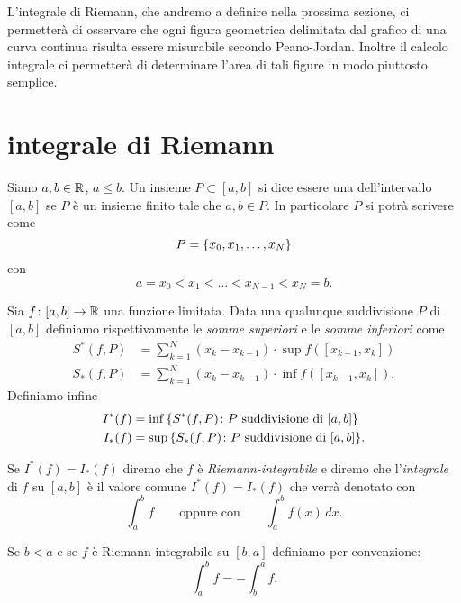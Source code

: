 L'integrale di Riemann, che andremo a definire
nella prossima sezione, ci permetterà di osservare che ogni figura geometrica
delimitata dal grafico di una curva continua risulta
essere misurabile secondo Peano-Jordan. Inoltre il calcolo integrale ci permetterà
di determinare l'area di tali figure in modo piuttosto semplice.


\section{integrale di Riemann}

\begin{definition}
\mymark{***}
Siano $a,b\in \mathbb R$, $a \le b$.
Un insieme $P\subset [a,b]$ si dice essere una 
dell'intervallo $[a,b]$ se $P$ è un insieme finito tale che $a,b\in P$.
In particolare $P$ si
potrà scrivere come
\[
 P = {\left\{  x_0, x_1, \dots, x_N \right\}}
\]
con
\[
  a = x_0 < x_1 < \dots < x_{N-1} < x_N = b.
\]

Sia $f\colon [a,b] \to \mathbb R$ una funzione limitata.
Data una qualunque suddivisione $P$ di $[a,b]$ definiamo
rispettivamente le \emph{somme superiori} e le \emph{somme inferiori}
come
\begin{align*}
S^*(f,P)
&= \sum_{k=1}^N (x_k - x_{k-1}) \cdot \sup f([x_{k-1},x_k]) \\
S_*(f,P)
&= \sum_{k=1}^N (x_k - x_{k-1}) \cdot \inf f([x_{k-1},x_k]).
\end{align*}
Definiamo infine
\begin{align*}
  I^*(f) &= \inf {\left\{ S^*(f,P) \colon \text{$P$ suddivisione di $[a,b]$} \right\}}
  \\
  I_*(f) &= \sup {\left\{ S_*(f,P) \colon \text{$P$ suddivisione di $[a,b]$} \right\}}.
\end{align*}

Se $I^*(f) = I_*(f)$ diremo che $f$ è
\emph{Riemann-integrabile}
%
%
%
%
%
e diremo che l'\emph{integrale} di $f$ su $[a,b]$ è
il valore comune $I^*(f)=I_*(f)$ che verrà denotato con
\[
  \int_a^b f
  \qquad{\text{oppure con}} \qquad
  \int_a^b f(x)\, dx.
\]

Se $b<a$ e se $f$ è Riemann integrabile su $[b,a]$
definiamo per convenzione:
\[
  \int_a^b f = -\int_b^a f.
\]
\end{definition}

